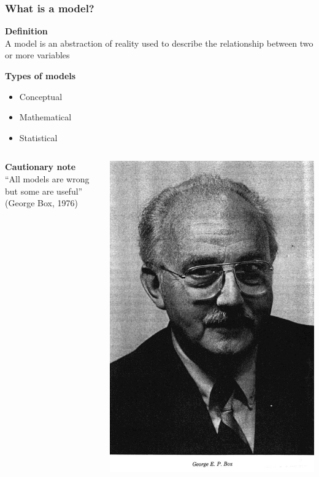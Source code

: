\documentclass[color=usenames,dvipsnames]{beamer}\usepackage[]{graphicx}\usepackage[]{color}
\begin{document}
\begin{frame}
  \frametitle{What is a model?}
    {\bf Definition} \\
    A model is an abstraction of reality used to describe the
    relationship between two or more variables \par
    \pause
    \vfill %
    {\bf Types of models}
    \begin{itemize}
      \item Conceptual
      \item Mathematical
      \item Statistical
    \end{itemize}
  \pause
  \vfill
  \begin{columns}%
    \begin{column}[T]{0.75\textwidth}
      {\bf Cautionary note} \\
      ``All models are wrong but some are useful'' \\ (George Box, 1976) %
    \end{column}
    \begin{column}[T]{0.15\textwidth}
      {\includegraphics[width=\textwidth]{figs/Box2}} \\

\end{column}
\end{columns}
\end{frame}
\end{document}
